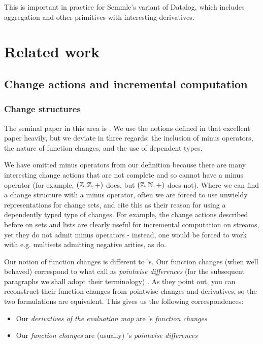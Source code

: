 This is important in practice for Semmle's variant of Datalog, which includes
aggregation and other primitives with interesting derivatives. 

\section{Related work}

\subsection{Change actions and incremental computation}

\subsubsection{Change structures}
\label{sec:relatedChangeStructures}

The seminal paper in this area is \textcite{cai2014changes}. We use the notions
defined in that excellent paper heavily, but we deviate in three regards: the
inclusion of minus operators, the nature of function changes, and the use of
dependent types.

We have omitted minus operators from our definition because
there are many interesting change actions that are not complete and so cannot
have a minus operator (for example, $(\mathbb{Z},\mathbb{Z},+)$ does, but $(\mathbb{Z},\mathbb{N},+)$ does
not). Where we can find a change structure with a minus operator, often we are
forced to use unwieldy representations for change sets, and
\citeauthor{cai2014changes} cite this as their reason for using a dependently
typed type of changes. For example, the change actions described before on sets and lists are clearly
useful for incremental computation on streams, yet they do not admit minus operators - instead, one would
be forced to work with e.g. multisets admitting negative arities, as \citeauthor{cai2014changes} do.

Our notion of function changes is different to \citeauthor{cai2014changes}'s.
Our function changes (when well behaved) correspond to what \citeauthor{cai2014changes} call as
\emph{pointwise differences} (for the subsequent paragraphs we shall adopt
their terminology) \autocite[See][section 2.2]{cai2014changes}. As they point out, you can reconstruct their
function changes from pointwise changes and derivatives, so the two formulations
are equivalent. This gives us the following correspondences:
\begin{itemize}
  \item Our \emph{derivatives of the evaluation map} are \citeauthor{cai2014changes}'s \emph{function changes}
  \item Our \emph{function changes} are (usually) \citeauthor{cai2014changes}'s \emph{pointwise differences}
\end{itemize}

